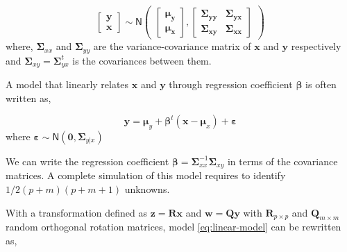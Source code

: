 \documentclass[11pt,twoside,openright,titlepage,
  headinclude,footinclude,BCOR=5mm,
  numbers=noenddot,cleardoublepage=empty,
  tablecaptionabove, dottedtoc,
  bibliography=totoc,paper=a4]{scrreprt}
\begin{document}
\begin{equation}
\begin{bmatrix}
  \mathbf{y}\\
  \mathbf{x}
\end{bmatrix} \sim
\mathsf{N}
\begin{pmatrix}
  \begin{bmatrix}
    \boldsymbol{\mu_y}\\
    \boldsymbol{\mu_x}
  \end{bmatrix},
  \begin{bmatrix}
    \boldsymbol{\Sigma_{yy}} & \boldsymbol{\Sigma_{yx}} \\
    \boldsymbol{\Sigma_{xy}} & \boldsymbol{\Sigma_{xx}}
  \end{bmatrix}
\end{pmatrix}
\label{eq:linear-model}
\end{equation}
where, \(\boldsymbol{\Sigma}_{xx}\) and \(\boldsymbol{\Sigma}_{yy}\) are the variance-covariance matrix of \(\mathbf{x}\) and \(\mathbf{y}\) respectively and \(\boldsymbol{\Sigma}_{xy} = \boldsymbol{\Sigma}_{yx}^t\) is the covariances between them.

A model that linearly relates \(\mathbf{x}\) and \(\mathbf{y}\) through regression coefficient \(\boldsymbol{\beta}\) is often written as,

\begin{equation}
\mathbf{y} = \boldsymbol{\mu}_y + \boldsymbol{\beta}^t\left(\mathbf{x} - \boldsymbol{\mu}_x\right) + \boldsymbol{\varepsilon}
\label{eq:linear-reg-model}
\end{equation}
where \(\boldsymbol{\varepsilon} \sim \textsf{N}\left(\mathbf{0}, \boldsymbol{\Sigma}_{y|x}\right)\)

We can write the regression coefficient \(\boldsymbol{\beta} = \boldsymbol{\Sigma}_{xx}^{-1}\boldsymbol{\Sigma}_{xy}\) in terms of the covariance matrices. A complete simulation of this model requires to identify \(1/2(p+m)(p+m+1)\) unknowns.

With a transformation defined as \(\mathbf{z} = \mathbf{Rx}\) and \(\mathbf{w} = \mathbf{Qy}\) with \(\mathbf{R}_{p\times p}\) and \(\mathbf{Q}_{m\times m}\) random orthogonal rotation matrices, model \eqref{eq:linear-model} can be rewritten as,
\end{document}
